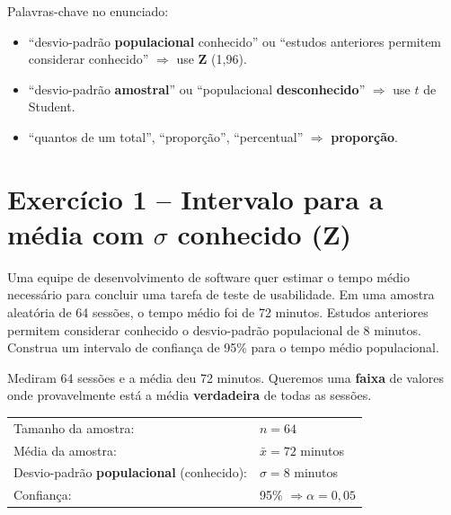 \documentclass[12pt,a4paper]{article}
\begin{document}
\begin{cuidado}
Palavras-chave no enunciado:
\begin{itemize}[leftmargin=*,itemsep=1pt]
  \item ``desvio-padrão \textbf{populacional} conhecido'' ou ``estudos anteriores permitem considerar conhecido'' $\Rightarrow$ use \textbf{Z} (1,96).
  \item ``desvio-padrão \textbf{amostral}'' ou ``populacional \textbf{desconhecido}'' $\Rightarrow$ use \textbf{$t$} de Student.
  \item ``quantos de um total'', ``proporção'', ``percentual'' $\Rightarrow$ \textbf{proporção}.
\end{itemize}
\end{cuidado}

\newpage
\section*{Exercício 1 -- Intervalo para a média com $\sigma$ conhecido (Z)}

\begin{enunciado}
Uma equipe de desenvolvimento de software quer estimar o tempo médio necessário para concluir uma tarefa de teste de usabilidade. Em uma amostra aleatória de 64 sessões, o tempo médio foi de 72 minutos. Estudos anteriores permitem considerar conhecido o desvio-padrão populacional de 8 minutos. Construa um intervalo de confiança de 95\% para o tempo médio populacional.
\end{enunciado}

\begin{traducao}
Mediram 64 sessões e a média deu 72 minutos. Queremos uma \textbf{faixa} de valores onde provavelmente está a média \textbf{verdadeira} de todas as sessões.
\end{traducao}

\begin{dados}
\begin{tabular}{ll}
Tamanho da amostra: & $n = 64$ \\
Média da amostra: & $\bar{x} = 72$ minutos \\
Desvio-padrão \textbf{populacional} (conhecido): & $\sigma = 8$ minutos \\
Confiança: & 95\% $\Rightarrow \alpha = 0,05$
\end{tabular}
\end{dados}
\end{document}
